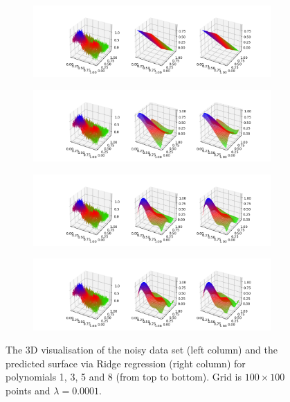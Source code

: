  \begin{figure}[!ht]
\begin{subfigure}{\textwidth}
  \centering
  \includegraphics[width=1\linewidth]{images/surf/fake_ridge_p01_n100.png}
\end{subfigure}
\begin{subfigure}{\textwidth}
  \centering
  \includegraphics[width=1\linewidth]{images/surf/fake_ridge_p03_n100.png}
\end{subfigure}
\begin{subfigure}{\textwidth}
  \centering
  \includegraphics[width=1\linewidth]{images/surf/fake_ridge_p05_n100.png}
\end{subfigure}
\begin{subfigure}{\textwidth}
  \centering
  \includegraphics[width=1\linewidth]{images/surf/fake_ridge_p08_n100.png}
\end{subfigure}
\caption{The 3D visualisation of the noisy data set (left column) and the predicted surface via Ridge regression (right column) for polynomials 1, 3, 5 and 8 (from top to bottom). Grid is $100\times100$ points and $\lambda = 0.0001$.}
\label{fig:ridge-surf2}
\end{figure}
 
